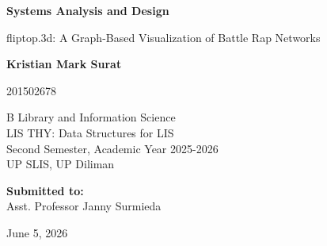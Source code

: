 \documentclass[12pt,a4paper]{article}
\begin{document}
\begin{titlepage}
    \centering
    \vspace*{3cm}
    
    {\Huge \textbf{Systems Analysis and Design}\par}
    \vspace{0.75cm}
    {\LARGE fliptop.3d: A Graph-Based Visualization of Battle Rap Networks\par}
    
    \vspace{3cm}
    
    {\Large \textbf{Kristian Mark Surat}\par}
    \vspace{0.25cm}
    {\large 201502678\par}
    
    \vspace{2.5cm}
    
    {\normalsize
    B Library and Information Science \\
    LIS THY: Data Structures for LIS \\
    Second Semester, Academic Year 2025-2026 \\
    UP SLIS, UP Diliman\par}
    
    \vspace{1cm}
    {\large \textbf{Submitted to:}\\
    Asst. Professor Janny Surmieda\par}
    
    \vfill
    
    {\large June 5, 2026\par}
    \vspace*{2cm}
\end{titlepage}

\begin{abstract}
This document outlines the Systems Analysis and Design (SAD) for the fliptop.3d project. The system is designed to provide a graph-based visualization of battle rap networks within the Fliptop Battle League in the Philippines. It models Emcees as nodes and their battle outcomes as directed or undirected edges. The architecture relies on a Command Query Responsibility Segregation (CQRS) pattern, utilizing PostgreSQL for relational data storage, Neo4j for complex graph traversal and rendering, and Upstash Redis for high-performance caching. This SAD provides a comprehensive view of the system's architecture, data models, diagrams, and underlying technologies.
\end{abstract}
\end{document}

